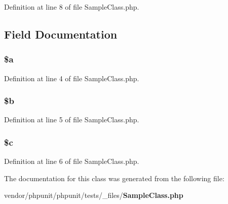Definition at line 8 of file Sample\+Class.\+php.



\subsection{Field Documentation}
\subsubsection[{\$a}]{\setlength{\rightskip}{0pt plus 5cm}\${\bf a}}\label{class_sample_class_acebf83966ef6d7e5645a6b62ba368f9f}


Definition at line 4 of file Sample\+Class.\+php.

\subsubsection[{\$b}]{\setlength{\rightskip}{0pt plus 5cm}\${\bf b}\hspace{0.3cm}{\ttfamily [protected]}}\label{class_sample_class_ab9eb087b791749ae45deabb0899b7ccc}


Definition at line 5 of file Sample\+Class.\+php.

\subsubsection[{\$c}]{\setlength{\rightskip}{0pt plus 5cm}\${\bf c}\hspace{0.3cm}{\ttfamily [protected]}}\label{class_sample_class_ab73d7f4f2dae233dd561e7fdaab3a77b}


Definition at line 6 of file Sample\+Class.\+php.



The documentation for this class was generated from the following file\+:\begin{DoxyCompactItemize}
\item 
vendor/phpunit/phpunit/tests/\+\_\+files/{\bf Sample\+Class.\+php}\end{DoxyCompactItemize}
